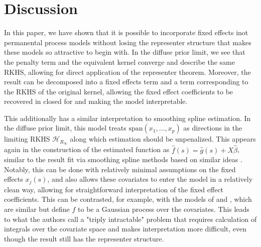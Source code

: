 \documentclass[ejsv2,preprint]{imsart}
\newcommand{\SPAN}[1]{\text{span}\left(#1\right)}
\begin{document}


\section{Discussion}

In this paper, we have shown that it is possible to incorporate fixed effects inot permanental process models without losing the representer structure that makes these models so attractive to begin with. In the diffuse prior limit, we see that the penalty term and the equivalent kernel converge and describe the same RKHS, allowing for direct application of the representer theorem. Moreover, the result can be decomposed into a fixed effects term and a term corresponding to the RKHS of the original kernel, allowing the fixed effect coefficients to be recovered in closed for and making the model interpretable. 

This additionally has a similar interpretation to smoothing spline estimation. In the diffuse prior limit, this model treats $\SPAN{x_1,...,x_p}$ as directions in the limiting RKHS $\mathcal{H}_{R_\infty}$ along which estimation should be unpenalized. This appears again in the construction of the estimated function as $\hat{f}(s)=\hat{g}(s)+X\hat{\beta}$, similar to the result fit via smoothing spline methods based on similar ideas \cite{wahba1990spline}. 
Notably, this can be done with relatively minimal assumptions on the fixed effects $x_j(s)$, and also allows these covariates to enter the model in a relatively clean way, allowing for straightforward interpretation of the fixed effect coefficients. This can be contrasted, for example, with the models of \cite{kim2022fast} and \cite{kim2023survivalpermprocs}, which are similar but define $f$ to be a Gaussian process over the covariates. This leads to what the authors call a "triply intractable" problem that requires calculation of integrals over the covariate space and makes interpretation more difficult, even though the result still has the representer structure. 
\end{document}
